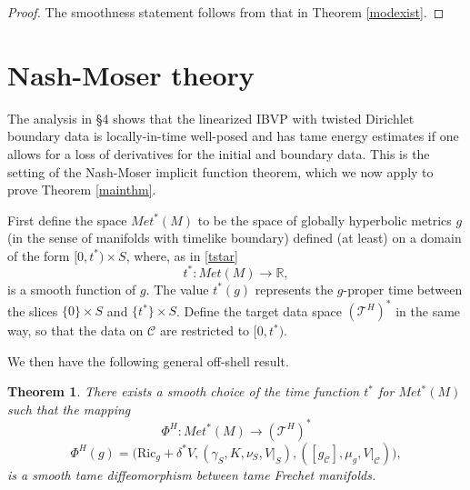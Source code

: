 \documentclass[10pt]{amsart}
\newcommand{\g}{\gamma}
\renewcommand{\d}{\delta}
\newcommand{\cC}{{\mathcal C}}
\newcommand{\cT}{{\mathcal T}}
\newcommand{\bR}{\mathbb R}
\newcommand{\Ric}{\mathrm{Ric}}
\newcommand{\be}{\begin{equation}}
\newcommand{\ee}{\end{equation}}
\renewcommand{\to}{\rightarrow}
\newcommand{\<}{\langle}
\renewcommand{\>}{\rangle}
\theoremstyle{plain}
\newtheorem{theorem}[lemma]{Theorem}
\theoremstyle{remark}
\theoremstyle{definition}
\numberwithin{equation}{section}
\begin{document}
\begin{proof}
  The smoothness statement follows from that in Theorem \ref{modexist}. 

\end{proof} 


   
   

  
\section{Nash-Moser theory}
   
   The analysis in \S 4 shows that the linearized IBVP with twisted Dirichlet boundary data is locally-in-time well-posed and has tame energy 
estimates if one allows for a loss of derivatives for the initial and boundary data. This is the setting of the Nash-Moser implicit function theorem, 
which we now apply to prove Theorem \ref{mainthm}. 

\medskip 

 First define the space $Met^*(M)$ to be the space of globally hyperbolic metrics $g$ (in the sense of manifolds with timelike boundary) defined (at 
 least) on a domain of the form $[0, t^*)\times S$, where, as in \eqref{tstar} 
 $$t^*: Met(M) \to \bR,$$
 is a smooth function of $g$. The value $t^*(g)$ represents the $g$-proper time between the slices $\{0\} \times S$ and $\{t^*\}\times S$. Define the 
 target data space $(\cT^H)^*$ in the same way, so that the data on $\cC$ are restricted to $[0, t^*)$. 
  
  We then have the following general off-shell result. 

\begin{theorem} \label{offshell}
There exists a smooth choice of the time function $t^*$ for $Met^*(M)$ such that the mapping 
\be \label{offPhi}
\Phi^H: Met^*(M) \to (\cT^H)^*
\ee
$$\Phi^H(g) = \big(\Ric_g + \d^*V, (\g_S, K, \nu_S, V|_S), ([g_{\cC}], \mu_g, V|_{\cC}) \big),$$
is a smooth tame diffeomorphism between tame Frechet manifolds. 
\end{theorem}
\end{document}
